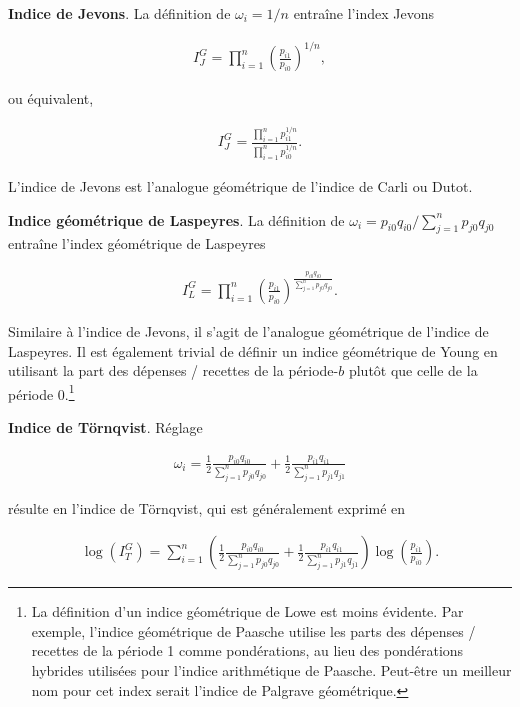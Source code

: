 \documentclass[
]{article}
\begin{document}
\textbf{Indice de Jevons}. La définition de \(\omega_{i} = 1 / n\) entraîne l'index Jevons

\begin{align*}
I^{G}_{J} = \prod_{i = 1}^{n} \left(\frac{p_{i1}}{p_{i0}} \right)^{1 / n},
\end{align*}

ou équivalent,

\begin{align*}
I^{G}_{J} = \frac{\prod_{i = 1}^{n} p_{i1}^{1 / n}}{\prod_{i = 1}^{n} p_{i0}^{1 / n}}.
\end{align*}

L'indice de Jevons est l'analogue géométrique de l'indice de Carli ou Dutot.

\textbf{Indice géométrique de Laspeyres}. La définition de \(\omega_{i} = p_{i0} q_{i0} / \sum_{j = 1}^{n} p_{j0} q_{j0}\) entraîne l'index géométrique de Laspeyres

\begin{align*}
I^{G}_{L} = \prod_{i = 1}^{n} \left(\frac{p_{i1}}{p_{i0}} \right)^{\frac{p_{i0} q_{i0}}{\sum_{j = 1}^{n} p_{j0} q_{j0}}}.
\end{align*}

Similaire à l'indice de Jevons, il s'agit de l'analogue géométrique de l'indice de Laspeyres. Il est également trivial de définir un indice géométrique de Young en utilisant la part des dépenses / recettes de la période-\(b\) plutôt que celle de la période 0.\footnote{La définition d'un indice géométrique de Lowe est moins évidente. Par exemple, l'indice géométrique de Paasche utilise les parts des dépenses / recettes de la période 1 comme pondérations, au lieu des pondérations hybrides utilisées pour l'indice arithmétique de Paasche. Peut-être un meilleur nom pour cet index serait l'indice de Palgrave géométrique.}

\textbf{Indice de Törnqvist}. Réglage

\begin{align*}
\omega_{i} = \frac{1}{2} \frac{p_{i0} q_{i0}}{\sum_{j = 1}^{n} p_{j0} q_{j0}} + \frac{1}{2} \frac{p_{i1} q_{i1}}{\sum_{j = 1}^{n} p_{j1} q_{j1}}
\end{align*}

résulte en l'indice de Törnqvist, qui est généralement exprimé en

\begin{align*}
\log(I^{G}_{T}) = \sum_{i = 1}^{n} \left(\frac{1}{2} \frac{p_{i0} q_{i0}}{\sum_{j = 1}^{n} p_{j0} q_{j0}} + \frac{1}{2} \frac{p_{i1} q_{i1}}{\sum_{j = 1}^{n} p_{j1} q_{j1}} \right) \log\left(\frac{p_{i1}}{p_{i0}} \right).
\end{align*}
\end{document}
